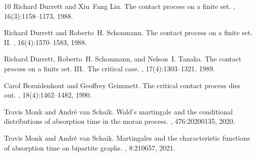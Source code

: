 \documentclass[a4paper,english,10pt]{amsart}
\theoremstyle{definition}
\numberwithin{equation}{section}
\begin{document}
\begin{thebibliography}{10}
Richard Durrett and Xiu~Fang Liu.
\newblock The contact process on a finite set.
, 16(3):1158--1173, 1988.

Richard Durrett and Roberto~H. Schonmann.
\newblock The contact process on a finite set. {II}.
, 16(4):1570--1583, 1988.

Richard Durrett, Roberto~H. Schonmann, and Nelson~I. Tanaka.
\newblock The contact process on a finite set. {III}.\ {T}he critical case.
, 17(4):1303--1321, 1989.

Carol Bezuidenhout and Geoffrey Grimmett.
\newblock The critical contact process dies out.
, 18(4):1462--1482, 1990.

Travis Monk and André van Schaik.
\newblock Wald’s martingale and the conditional distributions of absorption
  time in the moran process.
, 476:20200135, 2020.

Travis Monk and André van Schaik.
\newblock Martingales and the characteristic functions of absorption time on
  bipartite graphs.
, 8:210657, 2021.

\end{thebibliography}
\end{document}
